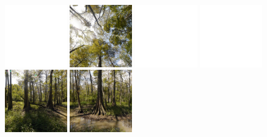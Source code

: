 \documentclass[oneside,10pt]{memoir}
\begin{document}
\begin{Spacing}{1.1}
\begin{figure}
  \centering
  \includegraphics[width=0.24\textwidth]{fig/blank.pdf}
  \includegraphics[width=0.24\textwidth]{fig/bluebonnet2.png}
  \includegraphics[width=0.24\textwidth]{fig/blank.pdf}
  \includegraphics[width=0.24\textwidth]{fig/blank.pdf}\\\vspace{1pt}
  \includegraphics[width=0.24\textwidth]{fig/bluebonnet0.png}
  \includegraphics[width=0.24\textwidth]{fig/bluebonnet5.png}

\end{figure}
\end{Spacing}
\end{document}
